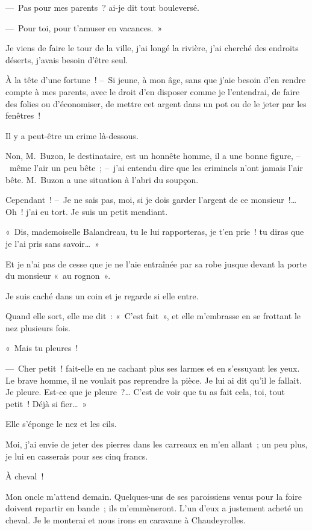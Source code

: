 \documentclass[french,twoside]{book} %
\begin{document}
— Pas pour mes parents ? ai-je dit tout bouleversé.\par
— Pour toi, pour t’amuser en vacances. »\par
\bigbreak
\noindent Je viens de faire le tour de la ville, j’ai longé la rivière, j’ai cherché des endroits déserts, j’avais besoin d’être seul.\par
À la tête d’une fortune ! – Si jeune, à mon âge, sans que j’aie besoin d’en rendre compte à mes parents, avec le droit d’en disposer comme je l’entendrai, de faire des folies ou d’économiser, de mettre cet argent dans un pot ou de le jeter par les fenêtres !\par
Il y a peut-être un crime là-dessous.\par
Non, M. Buzon, le destinataire, est un honnête homme, il a une bonne figure, – même l’air un peu bête ; – j’ai entendu dire que les criminels n’ont jamais l’air bête. M. Buzon a une situation à l’abri du soupçon.\par
\bigbreak
\noindent Cependant ! – Je ne sais pas, moi, si je dois garder l’argent de ce monsieur !… Oh ! j’ai eu tort. Je suis un petit mendiant.\par
\bigbreak
\noindent « Dis, mademoiselle Balandreau, tu le lui rapporteras, je t’en prie ! tu diras que je l’ai pris sans savoir… »\par
Et je n’ai pas de cesse que je ne l’aie entraînée par sa robe jusque devant la porte du monsieur « au rognon ».\par
Je suis caché dans un coin et je regarde si elle entre.\par
Quand elle sort, elle me dit : « C’est fait », et elle m’embrasse en se frottant le nez plusieurs fois.\par
« Mais tu pleures !\par
— Cher petit ! fait-elle en ne cachant plus ses larmes et en s’essuyant les yeux. Le brave homme, il ne voulait pas reprendre la pièce. Je lui ai dit qu’il le fallait. Je pleure. Est-ce que je pleure ?… C’est de voir que tu as fait cela, toi, tout petit ! Déjà si fier… »\par
Elle s’éponge le nez et les cils.\par
Moi, j’ai envie de jeter des pierres dans les carreaux en m’en allant ; un peu plus, je lui en casserais pour ses cinq francs.\par
\bigbreak
\noindent À cheval !\par
Mon oncle m’attend demain. Quelques-uns de ses paroissiens venus pour la foire doivent repartir en bande ; ils m’emmèneront. L’un d’eux a justement acheté un cheval. Je le monterai et nous irons en caravane à Chaudeyrolles.\par
\end{document}
